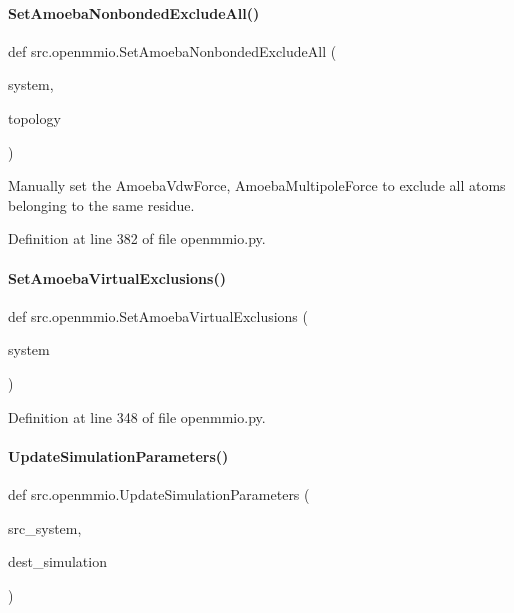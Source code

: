 \paragraph{\texorpdfstring{Set\+Amoeba\+Nonbonded\+Exclude\+All()}{SetAmoebaNonbondedExcludeAll()}}
{\footnotesize\ttfamily def src.\+openmmio.\+Set\+Amoeba\+Nonbonded\+Exclude\+All (\begin{DoxyParamCaption}\item[{}]{system,  }\item[{}]{topology }\end{DoxyParamCaption})}



Manually set the Amoeba\+Vdw\+Force, Amoeba\+Multipole\+Force to exclude all atoms belonging to the same residue. 



Definition at line 382 of file openmmio.\+py.

\mbox{\label{namespacesrc_1_1openmmio_a47edd2998916d71f064a34a8ab232e31}} 
\paragraph{\texorpdfstring{Set\+Amoeba\+Virtual\+Exclusions()}{SetAmoebaVirtualExclusions()}}
{\footnotesize\ttfamily def src.\+openmmio.\+Set\+Amoeba\+Virtual\+Exclusions (\begin{DoxyParamCaption}\item[{}]{system }\end{DoxyParamCaption})}



Definition at line 348 of file openmmio.\+py.

\mbox{\label{namespacesrc_1_1openmmio_adc5e020218883a8a87f7e1810d0a155e}} 
\paragraph{\texorpdfstring{Update\+Simulation\+Parameters()}{UpdateSimulationParameters()}}
{\footnotesize\ttfamily def src.\+openmmio.\+Update\+Simulation\+Parameters (\begin{DoxyParamCaption}\item[{}]{src\+\_\+system,  }\item[{}]{dest\+\_\+simulation }\end{DoxyParamCaption})}




